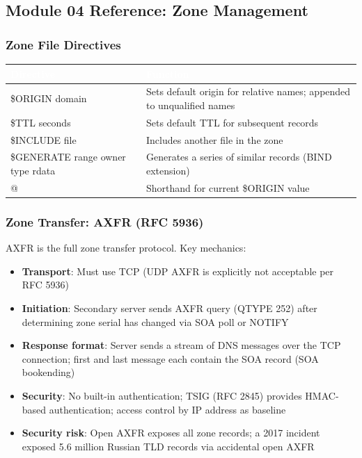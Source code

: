 \documentclass[11pt,letterpaper]{article}
\newcommand{\tableheader}[1]{\textbf{\sffamily\textcolor{white}{#1}}}
\begin{document}
\subsection{Module 04 Reference: Zone Management}

\subsubsection{Zone File Directives}

\begin{center}
\begin{tabularx}{\textwidth}{L{2.5cm}X}
\toprule
{}
\tableheader{Directive} & \tableheader{Function} \\
\midrule
\$ORIGIN domain & Sets default origin for relative names; appended to unqualified names \\
\$TTL seconds & Sets default TTL for subsequent records \\
\$INCLUDE file & Includes another file in the zone \\
\$GENERATE range owner type rdata & Generates a series of similar records (BIND extension) \\
@ & Shorthand for current \$ORIGIN value \\
\bottomrule
\end{tabularx}
\end{center}

\subsubsection{Zone Transfer: AXFR (RFC 5936)}

AXFR is the full zone transfer protocol. Key mechanics:
\begin{itemize}
  \item \textbf{Transport}: Must use TCP (UDP AXFR is explicitly not acceptable per RFC 5936)
  \item \textbf{Initiation}: Secondary server sends AXFR query (QTYPE 252) after determining zone serial has changed via SOA poll or NOTIFY
  \item \textbf{Response format}: Server sends a stream of DNS messages over the TCP connection; first and last message each contain the SOA record (SOA bookending)
  \item \textbf{Security}: No built-in authentication; TSIG (RFC 2845) provides HMAC-based authentication; access control by IP address as baseline
  \item \textbf{Security risk}: Open AXFR exposes all zone records; a 2017 incident exposed 5.6 million Russian TLD records via accidental open AXFR
\end{itemize}
\end{document}
